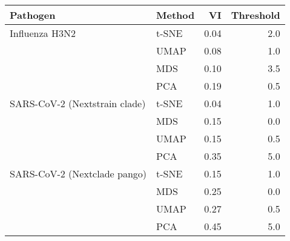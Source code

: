 \begin{tabular}{llrr}
\toprule
                     Pathogen & Method &   VI &  Threshold \\
\midrule
               Influenza H3N2 &  t-SNE & 0.04 &        2.0 \\
                              &   UMAP & 0.08 &        1.0 \\
                              &    MDS & 0.10 &        3.5 \\
                              &    PCA & 0.19 &        0.5 \\
SARS-CoV-2 (Nextstrain clade) &  t-SNE & 0.04 &        1.0 \\
                              &    MDS & 0.15 &        0.0 \\
                              &   UMAP & 0.15 &        0.5 \\
                              &    PCA & 0.35 &        5.0 \\
 SARS-CoV-2 (Nextclade pango) &  t-SNE & 0.15 &        1.0 \\
                              &    MDS & 0.25 &        0.0 \\
                              &   UMAP & 0.27 &        0.5 \\
                              &    PCA & 0.45 &        5.0 \\
\bottomrule
\end{tabular}
